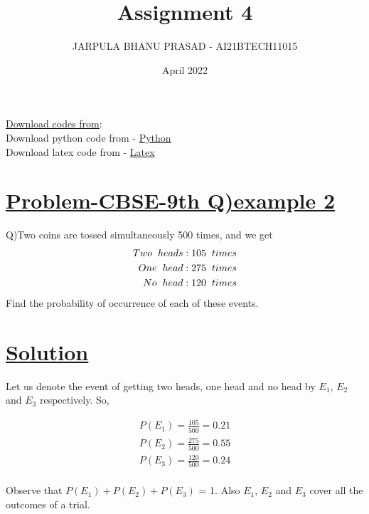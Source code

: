 \documentclass[journal,12pt,twocolumn]{IEEEtran}
\title{Assignment 4}
\author{JARPULA BHANU PRASAD - AI21BTECH11015}
\date{April 2022}
\begin{document}
\maketitle
\noindent \Large\underline{Download codes from}:\\
\noindent \large Download python code from - \href{https://github.com/jarpula-Bhanu/Assignment-4/blob/main/codes/probability.py}{Python}\\ Download latex code from - \href{https://github.com/jarpula-Bhanu/Assignment-4/blob/main/Assignment4.tex}{Latex}
\section{\large\underline{Problem-CBSE-9th Q)example 2}}
\large \noindent Q)Two coins are tossed simultaneously 500 times, and we get
\begin{align*}
Two \hspace{2mm} heads : 105 \hspace{2mm} times \\
One \hspace{2mm} head : 275 \hspace{2mm} times \\
No \hspace{2mm} head : 120 \hspace{2mm} times
\end{align*}
Find the probability of occurrence of each of these events.

\section{\large\underline{Solution}}
\noindent Let us denote the event of getting two heads, one head and no head by $E_1$, $E_2$ and $E_3$ respectively. So,

\begin{align}
P(E_1) = \frac{105}{500} = 0.21 \\
P(E_2) = \frac{275}{500} = 0.55 \\
P(E_3) = \frac{120}{500} = 0.24
\end{align}\\
\noindent Observe that $P(E_1)+P(E_2)+P(E_3)$ = 1. Also $E_1$, $E_2$ and $E_3$ cover all the outcomes of a trial.
\end{document}
